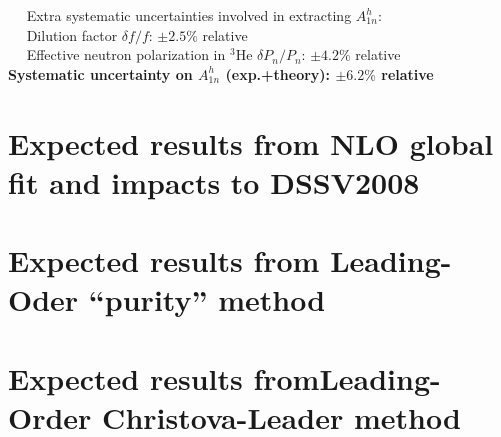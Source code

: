 \vspace{0.0mm}
\noindent ~\hspace{-0.4cm} ~Extra systematic uncertainties involved in extracting $A_{1n}^h$:  \\
\noindent ~\hspace{0.25cm} ~Dilution factor $\delta f/f$:        \hfill           $\pm 2.5 \%$  relative \\
\noindent ~\hspace{0.25cm} ~Effective neutron polarization in $^3$He $\delta P_n/P_n$:  \hfill           $\pm 4.2\%$  relative \\ 
\vspace{-3.0mm}
{\bf 
\noindent \hspace{0.5cm} Systematic uncertainty on $A_{1n}^h$ (exp.+theory):  \hfill          $\pm 6.2 \%$  relative } \\

\section{Expected results from NLO global fit and impacts to DSSV2008}

\section{Expected results from Leading-Oder ``purity''  method}

\section{Expected results fromLeading-Order Christova-Leader method}
